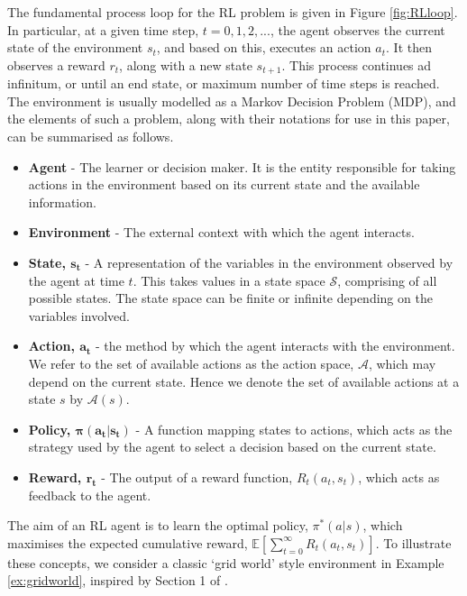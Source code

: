\documentclass{article}
\begin{document}

\noindent The fundamental process loop for the RL problem is given in Figure \ref{fig:RLloop}. In particular, at a given time step, $t = 0,1,2,...$, the agent observes the current state of the environment $s_t$, and based on this, executes an action $a_t$. It then observes a reward $r_t$, along with a new state $s_{t+1}$. This process continues ad infinitum, or until an end state, or maximum number of time steps is reached. The  environment is usually modelled as a Markov Decision Problem (MDP), and the elements of such a problem, along with their notations for use in this paper, can be summarised as follows. 

\begin{itemize}
    \item \textbf{Agent} - The learner or decision maker. It is the entity responsible for taking actions in the environment based on its current state and the available information.
    \item \textbf{Environment} - The external context with which the agent interacts. 
    \item \textbf{State, $\mathbf{s_t}$} - A representation of the variables in the environment observed by the agent at time $t$. This takes values in a state space $\mathcal{S}$, comprising of all possible states. The state space can be finite or infinite depending on the variables involved.
    \item \textbf{Action, $\mathbf{a_t}$} - the method by which the agent interacts with the environment. We refer to the set of available actions as the action space, $\mathcal{A}$, which may depend on the current state. Hence we denote the set of available actions at a state $s$ by $\mathcal{A}(s)$.
    \item \textbf{Policy, $\mathbf{\pi(a_t|s_t)}$} - A function mapping states to actions, which acts as the strategy used by the agent to select a decision based on the current state.   
    \item \textbf{Reward, $\mathbf{r_t}$} - The output of a reward function, $R_t(a_t,s_t)$, which acts as feedback to the agent.
    
\end{itemize}

\noindent The aim of an RL agent is to learn the optimal policy, $\pi^*(a|s)$, which maximises the expected cumulative reward, $\mathbb{E} \left[ \sum^{\infty}_{t=0}R_t(a_t,s_t) \right]$. To illustrate these concepts, we consider a classic `grid world' style environment in Example \ref{ex:gridworld}, inspired by Section 1 of \cite{sutton2018reinforcement}.
\end{document}
